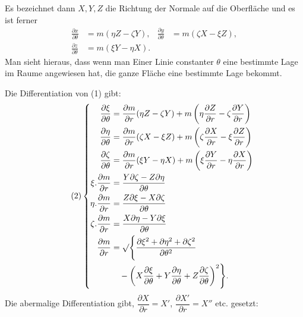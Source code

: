 %
\noindent Es bezeichnet dann $X,Y,Z$ die Richtung der Normale auf die Oberfläche und es ist ferner
\begin{equation}\tag{1}
\begin{aligned}
\frac{\partial x}{\partial\theta}&=m(\eta Z-\zeta Y),&\frac{\partial y}{\partial\theta}&=m(\zeta X-\xi Z),\\
\frac{\partial z}{\partial\theta}&=m(\xi Y-\eta X).
\end{aligned}
\end{equation}
\indent Man sieht hieraus, dass wenn man Einer Linie constanter $\theta$ eine bestimmte Lage im Raume angewiesen hat, die ganze Fläche eine bestimmte Lage bekommt.

Die Differentiation von (1) gibt:
\begin{equation}\tag{2}
\left\{\begin{aligned}
\frac{\partial\xi}{\partial\theta}&=\frac{\partial m}{\partial r}(\eta Z-\zeta Y)+m\left(\eta\frac{\partial Z}{\partial r}-\zeta\frac{\partial Y}{\partial r}\right)\\
\frac{\partial\eta}{\partial\theta}&=\frac{\partial m}{\partial r}(\zeta X-\xi Z)+m\left(\zeta\frac{\partial X}{\partial r}-\xi\frac{\partial Z}{\partial r}\right)\\
\frac{\partial\zeta}{\partial\theta}&=\frac{\partial m}{\partial r}(\xi Y-\eta X)+m\left(\xi\frac{\partial Y}{\partial r}-\eta\frac{\partial X}{\partial r}\right)\\
\xi.\frac{\partial m}{\partial r}&=\frac{Y\partial\zeta-Z\partial\eta}{\partial\theta}\\
\eta.\frac{\partial m}{\partial r}&=\frac{Z\partial\xi-X\partial\zeta}{\partial\theta}\\
\zeta.\frac{\partial m}{\partial r}&=\frac{X\partial\eta-Y\partial\xi}{\partial\theta}\\
\frac{\partial m}{\partial r}&=\mathord{\surd}\Biggl\{\frac{\partial\xi^2+\partial\eta^2+\partial\zeta^2}{\partial\theta^2}\\
&\quad-\left(X\frac{\partial\xi}{\partial\theta}+Y\frac{\partial\eta}{\partial\theta}+Z\frac{\partial\zeta}{\partial\theta}\right)^2\Biggr\}.
\end{aligned}\right.
\end{equation}
\indent Die abermalige Differentiation gibt, $\dfrac{\partial X}{\partial r}=X'$, $\dfrac{\partial X'}{\partial r}=X''$ etc. gesetzt:
